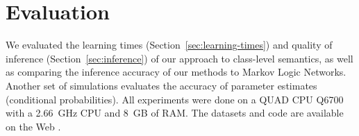 \documentclass[oribibl]{llncs}
\begin{document}
%


\section{Evaluation} \label{sec:eval}

%
We evaluated the learning times (Section~\ref{sec:learning-times}) and quality of inference (Section~\ref{sec:inference}) of our approach to class-level semantics, as well as comparing the inference accuracy of our methods to Markov Logic Networks.  Another set of simulations evaluates the accuracy of parameter estimates (conditional probabilities). 
All experiments were done on a QUAD CPU Q6700 with a 2.66~GHz CPU and 8~GB of RAM. The datasets and code are available on the Web \cite{bib:jbnsite}.
\end{document}
